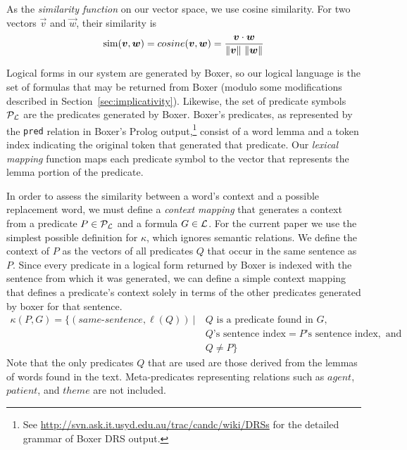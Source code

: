 As the \emph{similarity function} \simfunc on our vector space, we use cosine
similarity. For two vectors $\vec v$ and $\vec w$, their similarity is 
\[ \simfunc(\vec v, \vec w) = cosine(\vec v, \vec w) = \frac{\vec v \cdot \vec
w}{\|\vec v\|~\|\vec w\|}\]

Logical forms in our system are generated by Boxer, so our logical language
\loglang is the set of formulas that may be returned from Boxer (modulo
some modifications described in Section~\ref{sec:implicativity}).  Likewise, the
set of predicate symbols ${\cal{P}}_{{\cal{L}}}$ are the predicates generated by
Boxer. Boxer's predicates, as represented by the {\tt pred} relation in Boxer's
Prolog output,\footnote{See
\url{http://svn.ask.it.usyd.edu.au/trac/candc/wiki/DRSs} for the detailed
grammar of Boxer DRS output.} consist of a word lemma and a token index
indicating the original token that generated that predicate.  
Our \emph{lexical mapping} function maps each predicate symbol to the
vector that represents the lemma portion of the predicate.

In order to assess the similarity between a word's context and a possible
replacement word, we must define a \textit{context mapping} that generates a
context from a predicate $P \in {\cal{P}}_{{\cal{L}}}$ and a formula $G \in
{\cal{L}}$.  For the current paper we use the simplest possible
definition for $\kappa$, which ignores semantic relations. We define 
the context of $P$ as the
vectors of all predicates $Q$ that occur in the same sentence as $P$.
Since every predicate in a logical form returned by Boxer is indexed
with the sentence from which it was generated, we can define a simple context
mapping that defines a predicate's context solely in terms of the other
predicates generated by boxer for that sentence.
\begin{align*}
\kappa(P,G) = \{ (same\text{-}sentence, \ell(Q)) ~|
&~Q \text{ is a predicate found in } G, \\
&~Q\text{'s sentence index} = P\text{'s sentence index}, \text{ and } \\
&~Q \neq P \}
\end{align*}
Note that the only predicates $Q$ that are used are those derived from the
lemmas of words found in the text.  Meta-predicates representing relations such
as $agent$, $patient$, and $theme$ are not included.

